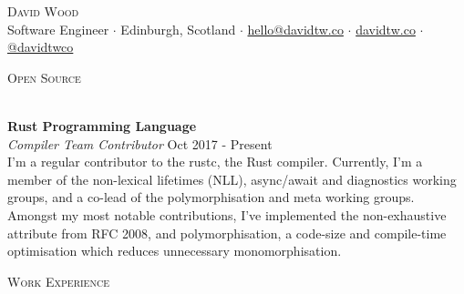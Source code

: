 \documentclass[a4paper]{article}
\newcommand{\lineunder} {
  \vspace*{-8pt} \\
  \hspace*{-18pt} \hrulefill \\
}
\newcommand{\header} [1] {
  {\hspace*{-18pt}\vspace*{6pt} \textsc{#1}}
  \vspace*{-6pt} \lineunder
}
\begin{document}
\fancyhead{}
\renewcommand{\headrulewidth}{0pt}

\fancyfoot{}
\fancyfoot[R]{\scriptsize\scshape\color{gray} \thepage}

\vspace*{-40pt}

\vspace*{-10pt}
\begin{center}
  {\Huge \scshape {David Wood}} \\
  \vspace{1mm}
  Software Engineer $\cdot$
  Edinburgh, Scotland $\cdot$
  \href{mailto:hello@davidtw.co}{hello@davidtw.co} $\cdot$
  \href{https://davidtw.co}{davidtw.co} $\cdot$
  \href{https://github.com/davidtwco}{@davidtwco} \\
\end{center}

\header{Open Source}
\vspace{1mm}

\textbf{Rust Programming Language} \\
\textit{Compiler Team Contributor} \hfill {\color{gray} Oct 2017 - Present} \\
\vspace{2mm}
I’m a regular contributor to the rustc, the Rust compiler. Currently, I'm a member of the
non-lexical lifetimes (NLL), async/await and diagnostics working groups, and a co-lead of the
polymorphisation and meta working groups. Amongst my most notable contributions, I've implemented
the non-exhaustive attribute from RFC 2008, and polymorphisation, a code-size and compile-time
optimisation which reduces unnecessary monomorphisation.
\vspace{2mm}

\header{Work Experience}
\vspace{1mm}
\end{document}
